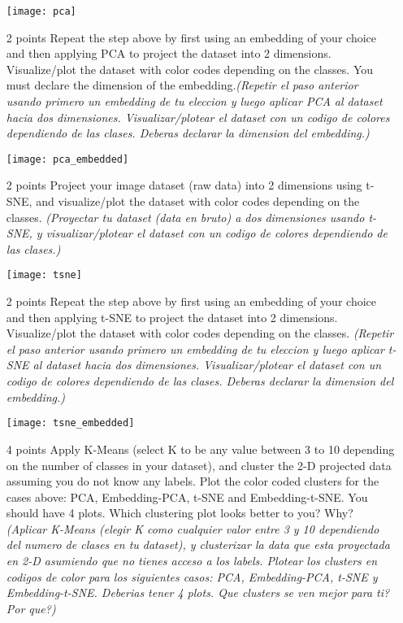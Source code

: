 \documentclass{article}
\begin{document}
\begin{enumerate}
             \texttt{[image: pca]}

        \item [2 points] Repeat the step above by first using an embedding of your choice and then applying PCA to project the dataset into 2 dimensions. Visualize/plot the dataset with color codes depending on the classes. You must declare the dimension of the embedding.\textit{(Repetir el paso anterior usando primero un embedding de tu eleccion y luego aplicar PCA al dataset hacia dos dimensiones. Visualizar/plotear el dataset con un codigo de colores dependiendo de las clases. Deberas declarar la dimension del embedding.)}

        \texttt{[image: pca\_embedded]}

        \item [2 points] Project your image dataset (raw data) into 2 dimensions using t-SNE, and visualize/plot the dataset with color codes depending on the classes. \textit{(Proyectar tu dataset (data en bruto) a dos dimensiones usando t-SNE, y visualizar/plotear el dataset con un codigo de colores dependiendo de las clases.)}

        \texttt{[image: tsne]}
        \item [2 points] Repeat the step above by first using an embedding of your choice and then applying t-SNE to project the dataset into 2 dimensions. Visualize/plot the dataset with color codes depending on the classes. \textit{(Repetir el paso anterior usando primero un embedding de tu eleccion y luego aplicar t-SNE al dataset hacia dos dimensiones. Visualizar/plotear el dataset con un codigo de colores dependiendo de las clases. Deberas declarar la dimension del embedding.)}

        \texttt{[image: tsne\_embedded]}
        \item [4 points] Apply K-Means (select K to be any value between 3 to 10 depending on the number of classes in your dataset), and cluster the 2-D projected data assuming you do not know any labels. Plot the color coded clusters for the cases above: PCA, Embedding-PCA, t-SNE and Embedding-t-SNE. You should have 4 plots. Which clustering plot looks better to you? Why? \textit{(Aplicar K-Means (elegir K como cualquier valor entre 3 y 10 dependiendo del numero de clases en tu dataset), y clusterizar la data que esta proyectada en 2-D asumiendo que no tienes acceso a los labels. Plotear los clusters en codigos de color para los siguientes casos: PCA, Embedding-PCA, t-SNE y Embedding-t-SNE. Deberias tener 4 plots. Que clusters se ven mejor para ti? Por que?)}


\end{enumerate}
\end{document}

